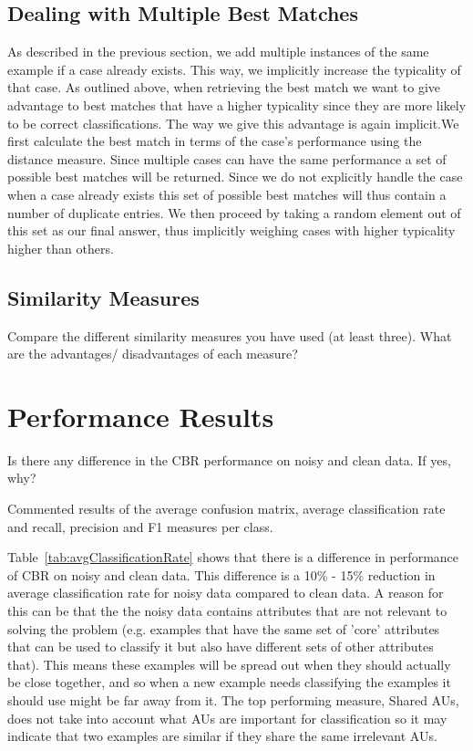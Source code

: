 \documentclass[10pt,a4paper]{article}
\begin{document}
\subsection{Dealing with Multiple Best Matches}
As described in the previous section, we add multiple instances of the same example if a case already exists. This way, we implicitly increase the typicality of that case. As outlined above, when retrieving the best match we want to give advantage to best matches that have a higher typicality since they are more likely to be correct classifications. The way we give this advantage is again implicit.We first calculate the best match in terms of the case's performance using the distance measure. Since multiple cases can have the same performance a set of possible best matches will be returned. Since we do not explicitly handle the case when a case already exists this set of possible best matches will thus contain a number of duplicate entries. We then proceed by taking a random element out of this set as our final answer, thus implicitly weighing cases with higher typicality higher than others.

\subsection{Similarity Measures}
Compare the different similarity measures you have used (at least three). What are the advantages/ disadvantages of each measure?

\section{Performance Results}

Is there any difference in the CBR performance on noisy and clean data. If yes, why?

Commented results of the average confusion matrix, average classification rate and recall, precision and F1 measures per class.

Table~\ref{tab:avgClassificationRate} shows that there is a difference in performance of CBR on noisy and clean data. This difference is a 10\% - 15\% reduction in average classification rate for noisy data compared to clean data. A reason for this can be that the the noisy data contains attributes that are not relevant to solving the problem (e.g. examples that have the same set of 'core' attributes that can be used to classify it but also have different sets of other attributes that). This means these examples will be spread out when they should actually be close together, and so when a new example needs classifying the examples it should use might be far away from it. The top performing measure, Shared AUs, does not take into account what AUs are important for classification so it may indicate that two examples are similar if they share the same irrelevant AUs.
\end{document}
